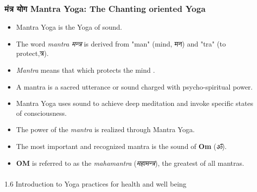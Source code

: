 \begin{frame}[fragile]\frametitle{मंत्र योग Mantra Yoga: The Chanting oriented Yoga}
    
\begin{itemize}
    \item Mantra Yoga is the Yoga of sound.
    \item The word \textit{mantra मन्त्र} is derived from "man" (mind, मन) and "tra" (to protect,त्र).
    \item \textit{Mantra} means that which protects the mind .
    \item A mantra is a sacred utterance or sound charged with psycho-spiritual power.
    \item Mantra Yoga uses sound to achieve deep meditation and invoke specific states of consciousness.
    \item The power of the \textit{mantra} is realized through Mantra Yoga.
    \item The most important and recognized mantra is the sound of \textbf{Om} (\textit{ॐ}).
    \item \textbf{OM} is referred to as the \textit{mahamantra} (\textit{महामन्त्र}), the greatest of all mantras.
\end{itemize}
    
\end{frame}



\begin{frame}[fragile]\frametitle{}
\begin{center}
{\Large 1.6 Introduction to Yoga practices for health and well being}
\end{center}
\end{frame}


